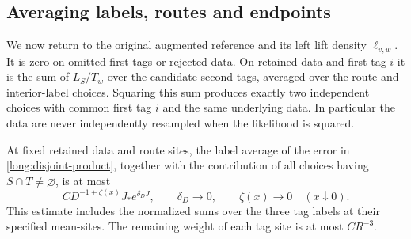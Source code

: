 \subsection{Averaging labels, routes and endpoints}

We now return to the original augmented reference and its left lift
density $\ell_{v,w}$.  It is zero on omitted first tags or rejected data.
On retained data and
first tag $i$ it is the sum of $L_S/T_w$ over the candidate second tags,
averaged over the route and interior-label choices.  Squaring this sum
produces exactly two independent choices with common first tag $i$ and
the same underlying data.  In particular the data are never independently
resampled when the likelihood is squared.

\begin{lemma}\label{long:label-average}
At fixed retained data and route sites, the label average of the error in
\eqref{long:disjoint-product}, together with the contribution of all
choices having $S\cap T\ne\varnothing$, is at most
\begin{equation}\label{long:label-error}
                C D^{-1+\zeta(x)}J_*e^{\delta_D J},
             \qquad \delta_D\longrightarrow0,
             \qquad \zeta(x)\longrightarrow0\quad(x\downarrow0).
\end{equation}
This estimate includes the normalized sums over the three tag labels at
their specified mean-sites.  The remaining weight of each tag site is
at most $CR^{-3}$.
\end{lemma}
